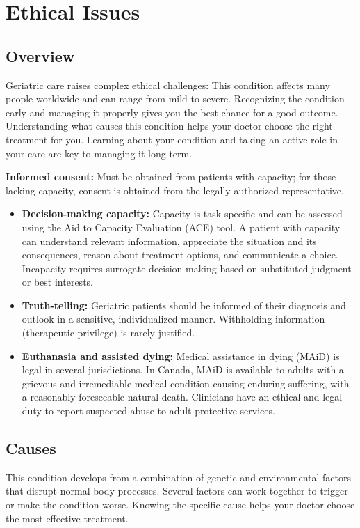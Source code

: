 \chapter{Ethical Issues}
\label{sec:Ethical Issues}

\section{Overview}
Geriatric care raises complex ethical challenges: This condition affects many people worldwide and can range from mild to severe. Recognizing the condition early and managing it properly gives you the best chance for a good outcome. Understanding what causes this condition helps your doctor choose the right treatment for you. Learning about your condition and taking an active role in your care are key to managing it long term.

\textbf{Informed consent:} Must be obtained from patients with capacity; for those lacking capacity, consent is obtained from the legally authorized representative.

\begin{itemize}[noitemsep]
  \item \textbf{Decision-making capacity:} Capacity is task-specific and can be assessed using the Aid to Capacity Evaluation (ACE) tool. A patient with capacity can understand relevant information, appreciate the situation and its consequences, reason about treatment options, and communicate a choice. Incapacity requires surrogate decision-making based on substituted judgment or best interests.
  \item \textbf{Truth-telling:} Geriatric patients should be informed of their diagnosis and outlook in a sensitive, individualized manner. Withholding information (therapeutic privilege) is rarely justified.
  \item \textbf{Euthanasia and assisted dying:} Medical assistance in dying (MAiD) is legal in several jurisdictions. In Canada, MAiD is available to adults with a grievous and irremediable medical condition causing enduring suffering, with a reasonably foreseeable natural death. Clinicians have an ethical and legal duty to report suspected abuse to adult protective services.
\end{itemize}

\section{Causes}
This condition develops from a combination of genetic and environmental factors that disrupt normal body processes. Several factors can work together to trigger or make the condition worse. Knowing the specific cause helps your doctor choose the most effective treatment.


